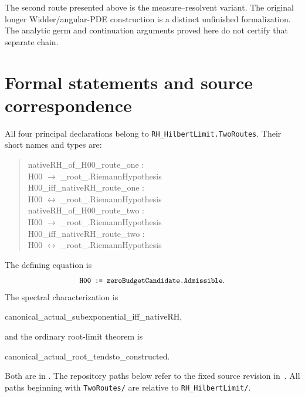 \documentclass[11pt,a4paper]{article}
\theoremstyle{definition}
\numberwithin{equation}{section}
\newcommand{\code}[1]{\texttt{\small #1}}
\begin{document}
The second route presented above is the measure--resolvent variant.
The original longer Widder/angular-PDE construction is a distinct
unfinished formalization. The analytic germ and continuation arguments
proved here do not certify that separate chain.

\appendix
\section{Formal statements and source correspondence}\label{app:source}
All four principal declarations belong to
\code{RH\_HilbertLimit.TwoRoutes}. Their short names and types are:
\begin{quote}\small\ttfamily
nativeRH\_of\_H00\_route\_one :\\
\hspace*{1em}H00 $\to$ \_root\_.RiemannHypothesis\\[4pt]
H00\_iff\_nativeRH\_route\_one :\\
\hspace*{1em}H00 $\leftrightarrow$ \_root\_.RiemannHypothesis\\[4pt]
nativeRH\_of\_H00\_route\_two :\\
\hspace*{1em}H00 $\to$ \_root\_.RiemannHypothesis\\[4pt]
H00\_iff\_nativeRH\_route\_two :\\
\hspace*{1em}H00 $\leftrightarrow$ \_root\_.RiemannHypothesis
\end{quote}
The defining equation is
\[
 \code{H00 := zeroBudgetCandidate.Admissible}.
\]
The spectral characterization is
\begin{center}\small\ttfamily
canonical\_actual\_subexponential\_iff\_nativeRH,
\end{center}
and the ordinary root-limit theorem is
\begin{center}\small\ttfamily
canonical\_actual\_root\_tendsto\_constructed.
\end{center}
Both are in .
The repository paths below refer to the fixed source revision
in~\cite{source}. All paths beginning with \code{TwoRoutes/} are
relative to \code{RH\_HilbertLimit/}.
\end{document}
